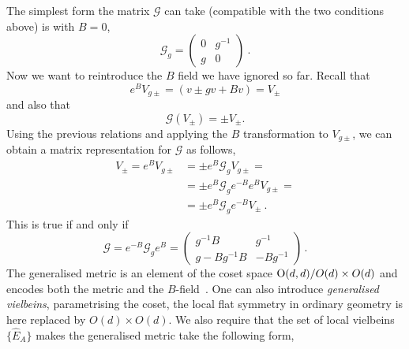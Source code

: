 \documentclass[debug]{phd}
\begin{document}
						The simplest form the matrix $\mathcal{G}$ can take (compatible with the two conditions above) is with $B=0$,
								\begin{equation*}
									\mathcal{G}_g = \begin{pmatrix} 0 & g^{-1} \\
 											g & 0 \end{pmatrix}\ .
								\end{equation*}
						Now we want to reintroduce the $B$ field we have ignored so far. 
						Recall that
								\begin{equation*}
									e^{B} V_{g\pm} = \left(v \pm gv + B v\right) = V_{\pm}
								\end{equation*}
						and also that 
								\begin{equation}\label{proj}
									\mathcal{G}\left(V_{\pm}\right) = \pm V_{\pm}.
								\end{equation}
						Using the previous relations and applying the $B$ transformation to $V_{g\pm}$, we can obtain a matrix representation for $\mathcal{G}$ as follows, 
								\begin{equation*}
									\begin{split}
										V_{\pm} = e^{B}V_{g\pm} & =\pm e^{B}\mathcal{G}_g V_{g\pm} = \\
														 & =\pm e^{B} \mathcal{G}_g e^{-B} e^{B} V_{g\pm} =\\
														 & = \pm e^{B} \mathcal{G}_g e^{-B} V_{\pm}\ .
									\end{split}
								\end{equation*}
						This is true if and only if
								\begin{equation}\label{genmet}
									\mathcal{G}= e^{-B} \mathcal{G}_g e^{B} = \begin{pmatrix} g^{-1}B & g^{-1} \\
																g - B g^{-1} B & -B g^{-1} \end{pmatrix}\, .
								\end{equation}
						The generalised metric is an element of the coset space $\mathrm{O}(d,d)/O(d) \times O(d)$ and encodes both the metric and the $B$-field~\cite{petrini3}.
						One can also introduce \emph{generalised vielbeins}, parametrising the coset, the local flat symmetry in ordinary geometry is here replaced by $O(d) \times O(d)$.
						We also require that the set of local vielbeins $\{\hat{E}_A\}$ makes the generalised metric take the following form,
\end{document}
